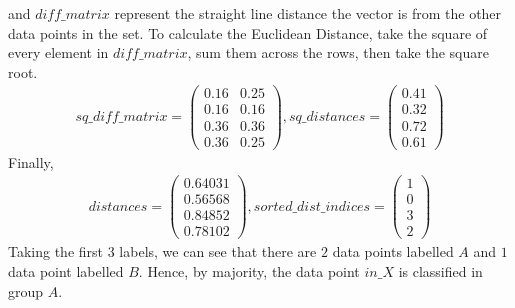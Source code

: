 \documentclass[11pt]{article}
\begin{document}
and $diff\_matrix$ represent the straight line distance the vector is from the other data points in the set. To calculate the Euclidean Distance, take the square of every element in $diff\_matrix$, sum them across the rows, then take the square root.
\begin{align*}
sq\_diff\_matrix = 
\begin{pmatrix}
0.16&0.25\\
0.16&0.16\\
0.36&0.36\\
0.36&0.25
\end{pmatrix},
sq\_distances = 
\begin{pmatrix}
0.41\\0.32\\0.72\\0.61
\end{pmatrix}
\end{align*}
Finally, 
\begin{align*}
distances = \begin{pmatrix}
0.64031\\0.56568 \\0.84852\\0.78102
\end{pmatrix},  
sorted\_dist\_indices = \begin{pmatrix}
1\\0\\3\\2
\end{pmatrix}
\end{align*}
Taking the first 3 labels, we can see that there are $2$ data points labelled $A$ and $1$ data point labelled $B$. Hence, by majority, the data point $in\_X$ is classified in group $A$.
\end{document}
